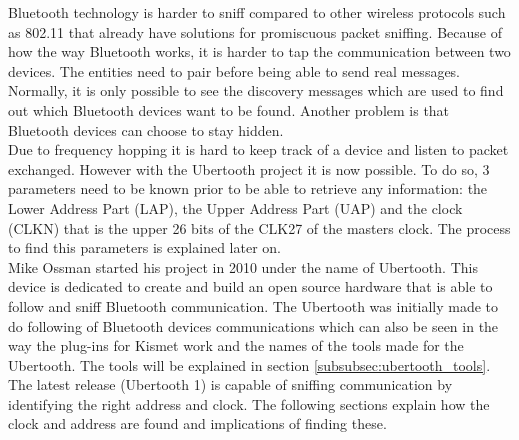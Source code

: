 \label{subsubsec:ubertooth}
Bluetooth technology is harder to sniff compared to other wireless protocols such as 802.11 that already have solutions for promiscuous packet sniffing. Because of how the way Bluetooth works, it is harder to tap the communication between two devices. The entities need to pair before being able to send real messages. Normally, it is only possible to see the discovery messages which are used to find out which Bluetooth devices want to be found. Another problem is that Bluetooth devices can choose to stay hidden. \\
Due to frequency hopping it is hard to keep track of a device and listen to packet exchanged. However with the Ubertooth project \cite{Ubertooth} it is now possible. To do so, 3 parameters need to be known prior to be able to retrieve any information: the Lower Address Part (LAP), the Upper Address Part (UAP) and the clock (CLKN) that is the upper 26 bits of the CLK27 of the masters clock. The process to find this parameters is explained later on.
\\
Mike Ossman started his project \cite{Ubertooth} in 2010 under the name of Ubertooth. This device is dedicated to create and build an open source hardware that is able to follow and sniff Bluetooth communication. The Ubertooth was initially made to do following of Bluetooth devices communications which can also be seen in the way the plug-ins for Kismet work and the names of the tools made for the Ubertooth. The tools will be explained in section \ref{subsubsec:ubertooth_tools}. The latest release (Ubertooth 1) is capable of sniffing communication by identifying the right address and clock. The following sections explain how the clock and address are found and implications of finding these.

